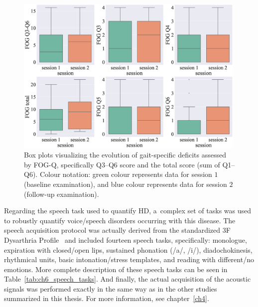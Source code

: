 \begin{figure}[htb!]
	\centering
	\scriptsize
	\includegraphics[width=0.99\textwidth]{pictures/ch6_box_plots_clin_fog.eps}
	\caption[Box plots for clinical data (gait assessment).]{Box plots visualizing the evolution of gait-specific deficits assessed by FOG-Q, specifically Q3--Q6 score and the total score (sum of Q1--Q6). Colour notation: green colour represents data for session $1$ (baseline examination), and blue colour represents data for session $2$ (follow-up examination).}
	\label{fig:ch6_boxplots}
\end{figure}

Regarding the speech task used to quantify HD, a~complex set of tasks was used to robustly quantify voice/speech disorders occurring with this disease. The speech acquisition protocol was actually derived from the standardized 3F Dysarthria Profile~\cite{Kostalova2013} and included fourteen speech tasks, specifically: monologue, expiration with closed/open lips, sustained phonation (/a/, /i/), diadochokinesis, rhythmical units, basic intonation/stress templates, and reading with different/no emotions. More complete description of these speech tasks can be seen in Table~\ref{tab:ch6_speech_tasks}. And finally, the actual acquisition of the acoustic signals was performed exactly in the same way as in the other studies summarized in this thesis. For more information, see chapter~\ref{ch4}.

